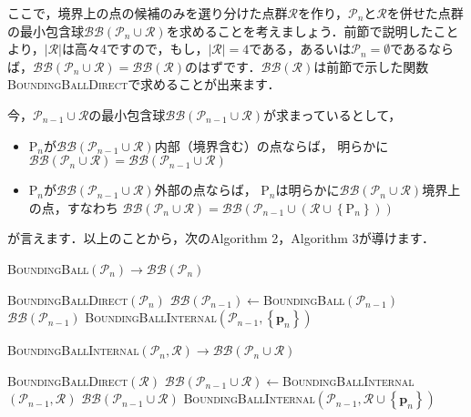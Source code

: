 ﻿\documentclass[a4paper]{jsarticle}
\begin{document}
ここで，境界上の点の候補のみを選り分けた点群$\mathcal{R}$を作り，$\mathcal{P}_{n}$と$\mathcal{R}$を併せた点群の最小包含球$\mathcal{BB}(\mathcal{P}_{n}\cup\mathcal{R})$を求めることを考えましょう．前節で説明したことより，$\left|\mathcal{R}\right|$は高々4ですので，もし，$\left|\mathcal{R}\right|=4$である，あるいは$\mathcal{P}_{n}=\emptyset$であるならば，$\mathcal{BB}(\mathcal{P}_{n}\cup\mathcal{R})=\mathcal{BB}(\mathcal{R})$のはずです．$\mathcal{BB}(\mathcal{R})$は前節で示した関数\textsc{BoundingBallDirect}で求めることが出来ます．

今，$\mathcal{P}_{n-1}\cup\mathcal{R}$の最小包含球$\mathcal{BB}(\mathcal{P}_{n-1}\cup\mathcal{R})$が求まっているとして，
\begin{itemize}
\item $\mathrm{P}_{n}$が$\mathcal{BB}(\mathcal{P}_{n-1}\cup\mathcal{R})$内部（境界含む）の点ならば，
明らかに$\mathcal{BB}(\mathcal{P}_{n}\cup\mathcal{R})=\mathcal{BB}(\mathcal{P}_{n-1}\cup\mathcal{R})$
\item $\mathrm{P}_{n}$が$\mathcal{BB}(\mathcal{P}_{n-1}\cup\mathcal{R})$外部の点ならば，
$\mathrm{P}_{n}$は明らかに$\mathcal{BB}(\mathcal{P}_{n}\cup\mathcal{R})$境界上の点，すなわち
$\mathcal{BB}(\mathcal{P}_{n}\cup\mathcal{R})=\mathcal{BB}(\mathcal{P}_{n-1}\cup(\mathcal{R}\cup\left\{\mathrm{P}_{n}\right\}))$
\end{itemize}
が言えます．以上のことから，次のAlgorithm 2，Algorithm 3が導けます．

\begin{algorithm}[h]
\caption{\textsc{BoundingBall}$(\mathcal{P}_{n})\rightarrow\mathcal{BB}(\mathcal{P}_{n})$}
\begin{algorithmic}[1]
   \textsc{BoundingBallDirect}$(\mathcal{P}_{n})$
\EndIf
\State $\mathcal{BB}(\mathcal{P}_{n-1})\leftarrow$\textsc{BoundingBall}$(\mathcal{P}_{n-1})$
   $\mathcal{BB}(\mathcal{P}_{n-1})$
\Else
   \textsc{BoundingBallInternal}$(\mathcal{P}_{n-1},\left\{\boldsymbol{p}_{n}\right\})$
\EndIf
\end{algorithmic}
\end{algorithm}

\begin{algorithm}[h]
\caption{\textsc{BoundingBallInternal}$(\mathcal{P}_{n},\mathcal{R})\rightarrow\mathcal{BB}(\mathcal{P}_{n}\cup\mathcal{R})$}
\begin{algorithmic}[1]
   \textsc{BoundingBallDirect}$(\mathcal{R})$
\EndIf
\State $\mathcal{BB}(\mathcal{P}_{n-1}\cup\mathcal{R})\leftarrow$\textsc{BoundingBallInternal}$(\mathcal{P}_{n-1},\mathcal{R})$
   $\mathcal{BB}(\mathcal{P}_{n-1}\cup\mathcal{R})$
\Else
   \textsc{BoundingBallInternal}$(\mathcal{P}_{n-1},\mathcal{R}\cup\left\{\boldsymbol{p}_{n}\right\})$
\EndIf
\end{algorithmic}
\end{algorithm}
\end{document}
